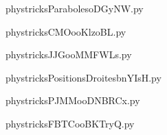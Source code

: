     \newcommand{\CaptionFigParabolesoDGyNW}{<+Type your caption here+>}
    \begin{center}
        
    \end{center}
    phystricksParabolesoDGyNW.py

    

    \clearpage
    


    \newcommand{\CaptionFigCMOooKlzoBL}{<+Type your caption here+>}
    \begin{center}
        
    \end{center}
    phystricksCMOooKlzoBL.py

    

    \clearpage
    


    \newcommand{\CaptionFigJJGooMMFWLs}{<+Type your caption here+>}
    \begin{center}
        
    \end{center}
    phystricksJJGooMMFWLs.py

    

    \clearpage
    


    \newcommand{\CaptionFigPositionsDroitesbnYIsH}{<+Type your caption here+>}
    \begin{center}
        
    \end{center}
    phystricksPositionsDroitesbnYIsH.py

    

    \clearpage
    


    \newcommand{\CaptionFigPJMMooDNBRCx}{<+Type your caption here+>}
    \begin{center}
        
    \end{center}
    phystricksPJMMooDNBRCx.py

    

    \clearpage
    


    \newcommand{\CaptionFigFBTCooBKTryQ}{<+Type your caption here+>}
    \begin{center}
        
    \end{center}
    phystricksFBTCooBKTryQ.py

